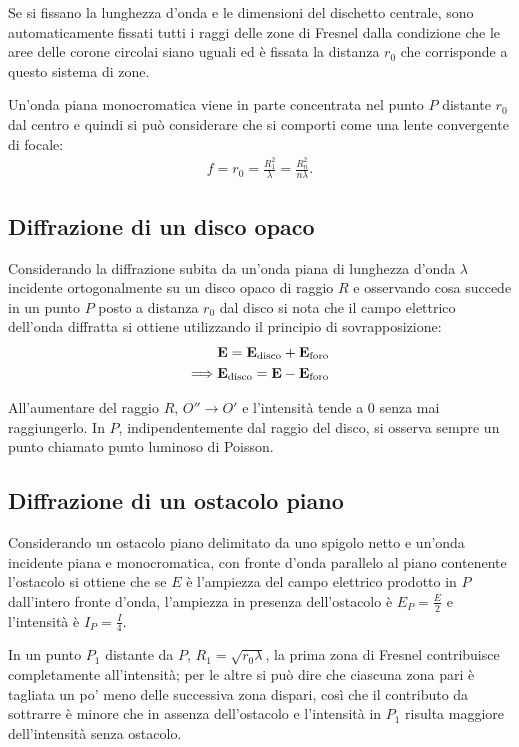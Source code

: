 Se si fissano la lunghezza d'onda e le dimensioni del dischetto centrale, sono automaticamente fissati tutti i raggi delle zone di Fresnel dalla condizione che le aree delle corone circolai siano uguali ed è fissata la distanza $r_0$ che corrisponde a questo sistema di zone.

Un'onda piana monocromatica viene in parte concentrata nel punto $P$ distante $r_0$ dal centro e quindi si può considerare che si comporti come una lente convergente di focale:
\begin{equation}\begin{split}
f=r_0=\frac{R_1^2}{\lambda}=\frac{R_n^2}{n\lambda}.
\end{split}\end{equation}

\subsection{Diffrazione di un disco opaco}
Considerando la diffrazione subita da un'onda piana di lunghezza d'onda $\lambda$ incidente ortogonalmente su un disco opaco di raggio $R$ e osservando cosa succede in un punto $P$ posto a distanza $r_0$ dal disco si nota che il campo elettrico dell'onda diffratta si ottiene utilizzando il principio di sovrapposizione:
\begin{equation}\begin{split}
\mathbf{E}=\mathbf{E}_{\textrm{disco}}+\mathbf{E}_{\textrm{foro}}\\
\Longrightarrow \mathbf{E}_{\textrm{disco}}=\mathbf{E}-\mathbf{E}_{\textrm{foro}}
\end{split}\end{equation}

All'aumentare del raggio $R$, $O''\to O'$ e l'intensità tende a 0 senza mai raggiungerlo. In $P$, indipendentemente dal raggio del disco, si osserva sempre un punto chiamato \b{punto luminoso di Poisson}.

\subsection{Diffrazione di un ostacolo piano}
Considerando un ostacolo piano delimitato da uno spigolo netto e un'onda incidente piana e monocromatica, con fronte d'onda parallelo al piano contenente l'ostacolo si ottiene che se $E$ è l'ampiezza del campo elettrico prodotto in $P$ dall'intero fronte d'onda, l'ampiezza in presenza dell'ostacolo è $E_P=\frac{E}{2}$ e l'intensità è $I_P=\frac{I}{4}$.

In un punto $P_1$ distante da $P$, $R_1=\sqrt{r_0\lambda}$, la prima zona di Fresnel contribuisce completamente all'intensità; per le altre si può dire che ciascuna zona pari è tagliata un po' meno delle successiva zona dispari, così che il contributo da sottrarre è minore che in assenza dell'ostacolo e l'intensità in $P_1$ risulta maggiore dell'intensità senza ostacolo.


